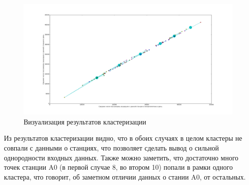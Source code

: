 \documentclass[12pt,a4paper,oneside]{extarticle}
\begin{document}
        \begin{figure}[ht!]
            \center
            \includegraphics[scale=0.3]{figure_2.png}
            \caption{Визуализация результатов кластеризации}
            \label{pic:case2}
        \end{figure}

    Из результатов кластеризации видно, что в обоих случаях в целом кластеры не совпали с данными о станциях, что позволяет сделать вывод о сильной однородности входных данных. Также можно заметить, что достаточно много точек станции A0 (в первой случае 8, во втором 10) попали в рамки одного кластера, что говорит, об заметном отличии данных о стании A0, от остальных.
\end{document}

